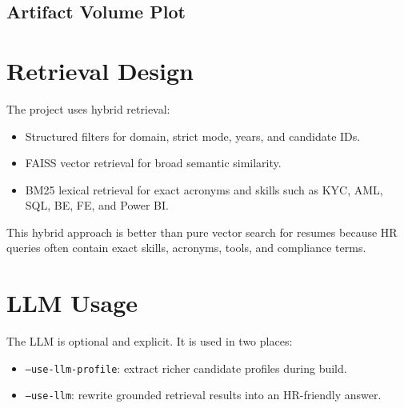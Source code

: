 \documentclass[11pt]{article}
\begin{document}
\subsection{Artifact Volume Plot}

\begin{center}
\end{center}

\section{Retrieval Design}

The project uses hybrid retrieval:

\begin{itemize}[leftmargin=*]
  \item Structured filters for domain, strict mode, years, and candidate IDs.
  \item FAISS vector retrieval for broad semantic similarity.
  \item BM25 lexical retrieval for exact acronyms and skills such as KYC, AML, SQL, BE, FE, and Power BI.
\end{itemize}

This hybrid approach is better than pure vector search for resumes because HR queries often contain exact skills, acronyms, tools, and compliance terms.

\section{LLM Usage}

The LLM is optional and explicit. It is used in two places:

\begin{itemize}[leftmargin=*]
  \item \texttt{--use-llm-profile}: extract richer candidate profiles during build.
  \item \texttt{--use-llm}: rewrite grounded retrieval results into an HR-friendly answer.
\end{itemize}
\end{document}
